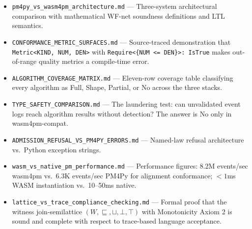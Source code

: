 \begin{itemize}
  \item \texttt{pm4py\_vs\_wasm4pm\_architecture.md} --- Three-system architectural
    comparison with mathematical WF-net soundness definitions and LTL semantics.
  \item \texttt{CONFORMANCE\_METRIC\_SURFACES.md} --- Source-traced demonstration
    that \texttt{Metric<KIND, NUM, DEN>} with \texttt{Require<\{NUM <= DEN\}>:
    IsTrue} makes out-of-range quality metrics a compile-time error.
  \item \texttt{ALGORITHM\_COVERAGE\_MATRIX.md} --- Eleven-row coverage table
    classifying every algorithm as Full, Shape, Partial, or No across the three
    stacks.
  \item \texttt{TYPE\_SAFETY\_COMPARISON.md} --- The laundering test: can
    unvalidated event logs reach algorithm results without detection? The answer
    is No only in wasm4pm-compat.
  \item \texttt{ADMISSION\_REFUSAL\_VS\_PM4PY\_ERRORS.md} --- Named-law refusal
    architecture vs.\ Python exception strings.
  \item \texttt{wasm\_vs\_native\_pm\_performance.md} --- Performance figures:
    8.2M events/sec wasm4pm vs.\ 6.3K events/sec PM4Py for alignment conformance;
    $< 1$ms WASM instantiation vs.\ 10--50ms native.
  \item \texttt{lattice\_vs\_trace\_compliance\_checking.md} --- Formal proof that
    the witness join-semilattice $(W, \sqsubseteq, \sqcup, \bot, \top)$ with
    Monotonicity Axiom 2 is sound and complete with respect to trace-based
    language acceptance.
\end{itemize}
